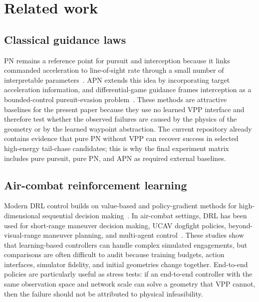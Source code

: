\section{Related work}\label{sec:related_work}

\subsection{Classical guidance laws}

PN remains a reference point for pursuit and interception because it links commanded acceleration to line-of-sight rate through a small number of interpretable parameters~\cite{pn,zarchan2012}. APN extends this idea by incorporating target acceleration information, and differential-game guidance frames interception as a bounded-control pursuit-evasion problem~\cite{apn1971,shima2002}. These methods are attractive baselines for the present paper because they use no learned VPP interface and therefore test whether the observed failures are caused by the physics of the geometry or by the learned waypoint abstraction. The current repository already contains evidence that pure PN without VPP can recover success in selected high-energy tail-chase candidates; this is why the final experiment matrix includes pure pursuit, pure PN, and APN as required external baselines.

\subsection{Air-combat reinforcement learning}

Modern DRL control builds on value-based and policy-gradient methods for high-dimensional sequential decision making~\cite{sutton2018book,mnih2015dqn,lillicrap2015ddpg,ppo}. In air-combat settings, DRL has been used for short-range maneuver decision making, UCAV dogfight policies, beyond-visual-range maneuver planning, and multi-agent control~\cite{ernest2016,mn2019,hu2021bvr,li2022msddqn,hu2022dual,fan2022a3c,liu2022mappo,zhu2024dt,chen2025dogfight}. These studies show that learning-based controllers can handle complex simulated engagements, but comparisons are often difficult to audit because training budgets, action interfaces, simulator fidelity, and initial geometries change together. End-to-end policies are particularly useful as stress tests: if an end-to-end controller with the same observation space and network scale can solve a geometry that VPP cannot, then the failure should not be attributed to physical infeasibility.

